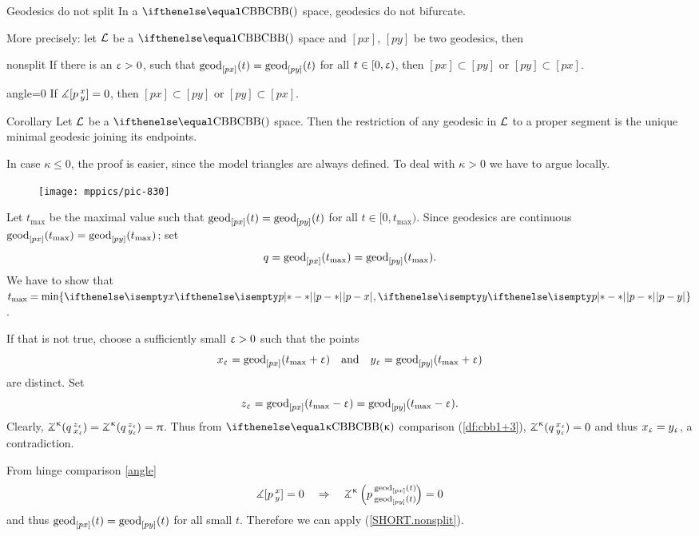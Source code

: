 \begin{thm}{Geodesics do not split}\label{thm:g-split}
In a $\Alex{}$ space, geodesics do not bifurcate.

More precisely: let $\mathcal{L}$ be a $\Alex{}$ space and $[p x]$, $[p y]$ be two geodesics, then
\begin{subthm}{nonsplit} If  there is an $\upvarepsilon>0$, such that $\mathrm{geod}_{[p x]}(t)=\mathrm{geod}_{[p y]}(t)$ 
for all $t\in[0,\eps)$, 
then $[p x]\subset [p y]$ or $[p y]\subset [p x]$.
\end{subthm}

\begin{subthm}{angle=0}
If $\measuredangle[p\,{}^{x}_{y}]=0$, then $[p x]\subset [p y]$ or $[p y]\subset [p x]$.
\end{subthm}
\end{thm}

\begin{thm}{Corollary}\label{cor:unique-geod-cbb}
Let $\mathcal{L}$ be a $\Alex{}$ space.
Then the restriction of any geodesic in $\mathcal{L}$ to a proper segment is the unique minimal geodesic joining its endpoints.
\end{thm}

In case $\kappa\le 0$, the proof is easier, since the model triangles are always defined.
To deal with $\kappa>0$ we have to argue locally.

\begin{wrapfigure}{r}{25 mm}
\vskip-0mm
\centering
\texttt{[image: mppics/pic-830]}
\end{wrapfigure}

Let $t_{\max}$ be the maximal value 
such that $\mathrm{geod}_{[p x]}(t)=\mathrm{geod}_{[p y]}(t)$ for all $t\in [0,t_{\max})$.
Since geodesics are continuous $\geod_{[p x]}(t_{\max})\z=\geod_{[p y]}(t_{\max})$; 
set
\[q=\geod_{[p x]}(t_{\max})\z=\geod_{[p y]}(t_{\max}).\]
We have to show that $t_{\max}=\min\{\dist{p}{x}{},\dist{p}{y}{}\}$.

If that is not true, choose a sufficiently small $\upvarepsilon>0$ such that the  points
\[x_\upvarepsilon=\mathrm{geod}_{[p x]}(t_{\max}+\upvarepsilon)\quad 
\text{and}\quad  
  y_\upvarepsilon=\mathrm{geod}_{[p y]}(t_{\max}+\upvarepsilon)\] 
are distinct.
Set
\[z_\upvarepsilon=\mathrm{geod}_{[p x]}(t_{\max}-\upvarepsilon)
=\mathrm{geod}_{[p y]}(t_{\max}-\upvarepsilon).\]
Clearly, $\angk\kappa q{z_\eps}{x_\eps}=\angk\kappa q{z_\eps}{y_\eps}=\pi$.
Thus from $\Alex\kappa$ comparison (\ref{df:cbb1+3}), $\angk\kappa q{x_\eps}{y_\eps}=0$ and thus $x_\upvarepsilon=y_\upvarepsilon$, a contradiction.

\parit{(\ref{SHORT.angle=0})} From hinge comparison \ref{angle} 
\[\mangle\hinge p x y=0\quad \Rightarrow\quad \angkk\kappa p{\geod_{[p x]}(t)}{\geod_{[p y]}(t)}=0\] 
and thus ${\mathrm{geod}_{[p x]}(t)}={\mathrm{geod}_{[p y]}(t)}$ for all small $t$. 
Therefore we can apply (\ref{SHORT.nonsplit}).
\qeds

